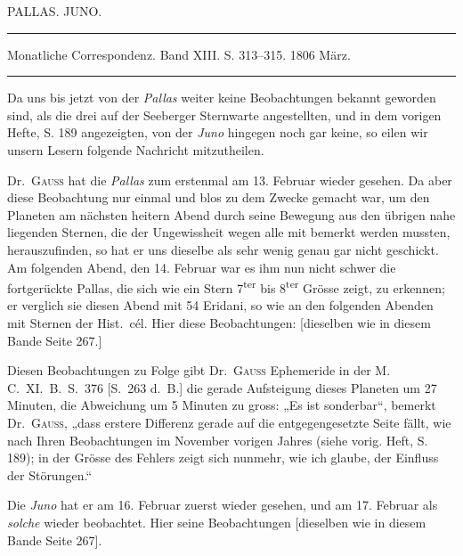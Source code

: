 \clearpage
{}
\hypertarget{native-274-lower}{}
\begin{center}
PALLAS. JUNO.

\rule{0.6\linewidth}{0.4pt}

Monatliche Correspondenz. Band XIII. S. 313–315. 1806 März.

\rule{0.6\linewidth}{0.4pt}
\end{center}

\par\indent Da uns bis jetzt von der \emph{Pallas} weiter keine Beobachtungen bekannt geworden sind, als die drei auf der Seeberger Sternwarte angestellten, und in dem vorigen Hefte, S. 189 angezeigten, von der \emph{Juno} hingegen noch gar keine, so eilen wir unsern Lesern folgende Nachricht mitzutheilen.

\par\indent Dr.\ \textsc{Gauss} hat die \emph{Pallas} zum erstenmal am 13. Februar wieder gesehen. Da aber diese Beobachtung nur einmal und blos zu dem Zwecke gemacht war, um den Planeten am nächsten heitern Abend durch seine Bewegung aus den übrigen nahe liegenden Sternen, die der Ungewissheit wegen alle mit bemerkt werden mussten, herauszufinden, so hat er uns dieselbe als sehr wenig genau gar nicht geschickt. Am folgenden Abend, den 14. Februar war es ihm nun nicht schwer die fortgerückte Pallas, die sich wie ein Stern 7\textsuperscript{ter} bis 8\textsuperscript{ter} Grösse zeigt, zu erkennen; er verglich sie diesen Abend mit 54 Eridani, so wie an den folgenden Abenden mit Sternen der Hist.\ cél. Hier diese Beobachtungen: [dieselben wie in diesem Bande Seite 267.]

\par\indent Diesen Beobachtungen zu Folge gibt Dr.\ \textsc{Gauss} Ephemeride in der M.\,C.\ XI.\ B.\ S.\ 376 [S.\ 263 d.\ B.] die gerade Aufsteigung dieses Planeten um 27 Minuten, die Abweichung um 5 Minuten zu gross: „Es ist sonderbar“, bemerkt Dr.\ \textsc{Gauss}, „dass erstere Differenz gerade auf die entgegengesetzte Seite fällt, wie nach Ihren Beobachtungen im November vorigen Jahres (siehe vorig. Heft, S. 189); in der Grösse des Fehlers zeigt sich nunmehr, wie ich glaube, der Einfluss der Störungen.“

\par\indent Die \emph{Juno} hat er am 16. Februar zuerst wieder gesehen, und am 17. Februar als \emph{solche} wieder beobachtet. Hier seine Beobachtungen [dieselben wie in diesem Bande Seite 267].

